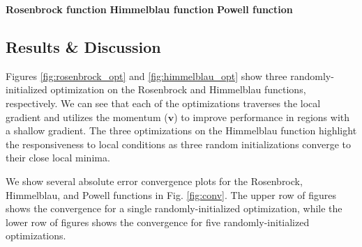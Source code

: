 \documentclass[conference]{IEEEtran}
\begin{document}
\begin{figure*}
    
    \hspace*{0.73in} \textbf{Rosenbrock function} \hspace*{1.03in} \textbf{Himmelblau function} \hspace*{1.16 in} \textbf{Powell function} \vspace*{0.05 in}
    
    \hfill
     
    \hfill
     
    \hfill
    
    \hfill
    
    \vspace{0.05in}
    
    \hfill
     
    \hfill
     
    \hfill
    
    \hfill
    
    \caption{Convergence of the absolute error in optimizing the Rosenbrock function (\textit{left}), the Himmelblau function (\textit{center}), and the Powell function (\textit{right}). The upper figures depict a single randomly-initialized optimization and the lower figures depict a series of five randomly-initialized optimizations, demonstrating consistency in the convergence to a global minimum.}
    \label{fig:conv}
\end{figure*}

\subsection{Results \& Discussion}
Figures \ref{fig:rosenbrock_opt} and \ref{fig:himmelblau_opt} show three randomly-initialized optimization on the Rosenbrock and Himmelblau functions, respectively. We can see that each of the optimizations traverses the local gradient and utilizes the momentum ($\textbf{v}$) to improve performance in regions with a shallow gradient. The three optimizations on the Himmelblau function highlight the responsiveness to local conditions as three random initializations converge to their close local minima.

We show several absolute error convergence plots for the Rosenbrock, Himmelblau, and Powell functions in Fig. \ref{fig:conv}. The upper row of figures shows the convergence for a single randomly-initialized optimization, while the lower row of figures shows the convergence for five randomly-initialized optimizations. 
\end{document}
